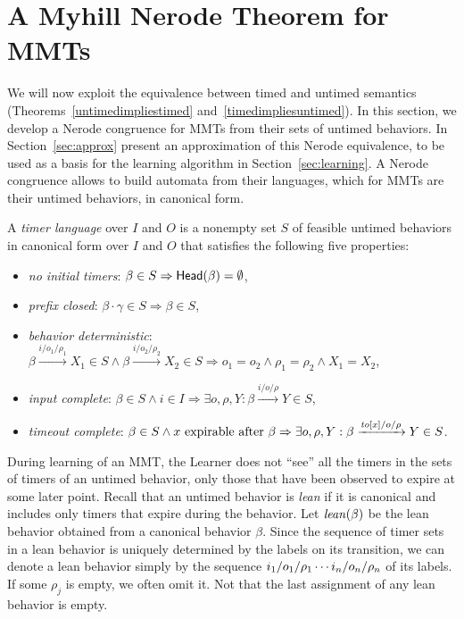\section{A Myhill Nerode Theorem for MMTs}
\label{sec:nerode}
\label{sec:bj-nerode}

We will now exploit the equivalence between timed and untimed semantics
(Theorems~\ref{untimedimpliestimed} and~\ref{timedimpliesuntimed}).
In this section, we develop a Nerode congruence for  MMTs
from their sets of untimed behaviors.
In Section~\ref{sec:approx} present an approximation of this
Nerode equivalence, to be used as a basis for the learning algorithm in
Section~\ref{sec:learning}.
  A Nerode congruence allows to build automata from their languages, which for MMTs are their untimed behaviors, in canonical form.

\begin{definition}
\label{def:timer language}
A \emph{timer language} over $I$ and $O$ is a nonempty set 
$S$ of feasible untimed behaviors in canonical form over $I$ and $O$ that satisfies the following five properties:
\begin{itemize}
\item
\emph{no initial timers}: $\beta \in S \Rightarrow \mathsf{Head}({\beta}) = \emptyset$,
\item
\emph{prefix closed}: $\beta \cdot \gamma \in S \Rightarrow \beta \in S$,
\item
\emph{behavior deterministic}:
$\beta \xrightarrow{i/o_1/\rho_1} X_1 \in S \wedge \beta \xrightarrow{i/o_2/\rho_2} X_2 \in S \Rightarrow o_1 = o_2 \wedge \rho_1 = \rho_2 \wedge X_1 = X_2$,
\item
\emph{input complete}:
$\beta \in S \wedge i \in I \Rightarrow \exists o, \rho, Y : \beta \xrightarrow{i/o/\rho} Y \in S$,
\item
\emph{timeout complete}:
$\beta \in S \wedge x \mbox{ expirable after } \beta \Rightarrow
\exists o, \rho, Y: \beta \xrightarrow{\mathit{to}[x]/o/\rho} Y \in S$.
\end{itemize}
\end{definition}

During learning of an MMT, the Learner does not ``see'' all the timers
in the sets of timers of an untimed behavior, only those that have
been observed to expire at some later point. 
Recall that an untimed behavior is {\em lean} if it is canonical and
includes only timers that expire during the behavior.
Let $\mathit{lean}({\beta})$ be the lean behavior obtained from a canonical
behavior $\beta$.
Since the sequence of timer sets in a lean behavior is
uniquely determined by the labels on its transition, we can
denote a lean behavior simply by the sequence
$i_1/o_1/\rho_1 \cdots i_n/o_n/\rho_n$ of its labels.
If some $\rho_j$ is empty, we often omit it. Not that
the last assignment of any lean behavior is empty.


